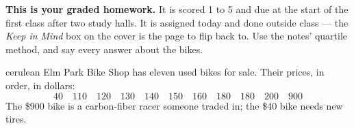 \documentclass[12pt]{article}
\begin{document}

\vspace{0.04in}

\begin{remindbox}
\small
\textbf{This is your graded homework.} It is scored 1 to 5 and due at
the start of the first class after two study halls. It is assigned today and done outside
class --- the \emph{Keep in Mind} box on the cover is the page to flip back to. Use the notes'
quartile method, and say every answer about the bikes.
\end{remindbox}

\vspace{0.03in}

\boxguard[20]
\begin{scenariobox}{cerulean}
Elm Park Bike Shop has eleven used bikes for sale. Their prices, in order, in dollars:
\[ 40 \quad 110 \quad 120 \quad 130 \quad 140 \quad 150 \quad 160 \quad 180 \quad 180 \quad 200
   \quad 900 \]
The \$900 bike is a carbon-fiber racer someone traded in; the \$40 bike needs new tires.
\end{scenariobox}

\vspace{0.03in}
\end{document}
